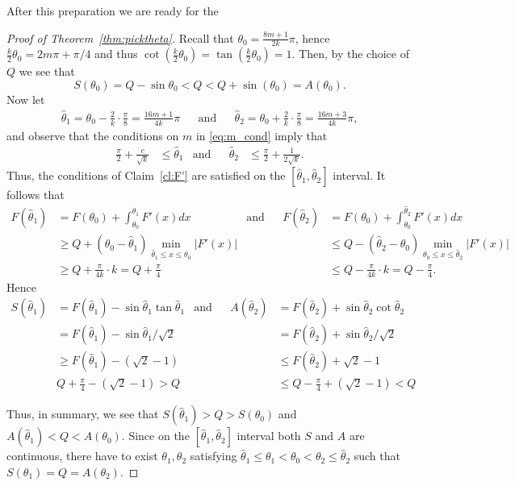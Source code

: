\documentclass{article}
\theoremstyle{definition}
\numberwithin{equation}{section}
\numberwithin{theorem}{section}
\newcommand{\htheta}{\hat{\theta}}
\begin{document}
After this preparation we are ready for the 
\begin{proof}[Proof of Theorem~\ref{thm:picktheta}]
Recall that $\theta_0 = \tfrac{8m+1}{2k}\pi$, hence \(\tfrac{k}{2}\theta_0 = 2m\pi + \pi/4\) and thus $\cot(\tfrac{k}{2}\theta_0) = \tan(\tfrac{k}{2}\theta_0)=1$. Then, by the choice of $Q$ we see that 
\[ S(\theta_0 ) = Q -  \sin \theta_0  < Q < Q + \sin(\theta_0) = A(\theta_0).\]
Now let  
\begin{align*} \htheta_1 = \theta_0 - \frac{2}{k}\cdot \frac{\pi}{8} = \frac{16m+1}{4k}\pi && \mbox{and} && \htheta_2 = \theta_0 + \frac{2}{k}\cdot \frac{\pi}{8} = \frac{16m+3}{4k}\pi,\end{align*} and observe that the conditions on $m$ in \eqref{eq:m_cond} imply that 
\begin{align*}\frac{\pi}{2} + \frac{c}{\sqrt{k}} &\leq \htheta_1 & \mbox{and}&& \htheta_2 &\leq \frac{\pi}{2} + \frac{1}{2\sqrt{k}}.
\end{align*} Thus, the conditions of Claim~\ref{cl:F'} are satisfied on the $[\htheta_1,\htheta_2]$ interval. It follows that
\begin{align*}
    F(\htheta_1) &= F(\theta_0)+\int_{\theta_0}^{\htheta_1} F'(x)dx & \mbox{and}& & F(\htheta_2) &= F(\theta_0) + \int_{\theta_0}^{\htheta_2} F'(x)dx \\
    &\geq Q + (\theta_0-\htheta_1)\min_{\htheta_1 \leq x \leq \theta_0} |F'(x)| &&& &\leq Q - (\htheta_2-\theta_0)\min_{\theta_0 \leq x \leq \htheta_2} |F'(x)|\\
    &\geq Q + \frac{\pi}{4k} \cdot k = Q+ \frac{\pi}{4} &&& &\leq Q - \frac{\pi}{4k}\cdot k = Q - \frac{\pi}{4}. \end{align*}
Hence 
\begin{align*}
    S(\htheta_1) &= F(\htheta_1) - \sin \htheta_1 \tan \htheta_1 & \mbox{and}& & A(\htheta_2)&= F(\htheta_2) + \sin \htheta_2 \cot \htheta_2 \\
    &=F(\htheta_1) - \sin \htheta_1 / \sqrt{2}& && &= F(\htheta_2) + \sin \htheta_2/ \sqrt{2} \\
    &\geq F(\htheta_1)-(\sqrt{2}-1) && &&  \leq F(\htheta_2)+\sqrt{2}-1 \\
    &Q + \frac{\pi}{4} - (\sqrt{2}-1) >Q&& && \leq Q - \frac{\pi}{4} + (\sqrt{2}-1) < Q
\end{align*}

Thus, in summary, we see that $S(\htheta_1) > Q > S(\theta_0)$ and $A(\htheta_1) < Q < A(\theta_0)$. Since on the $[\htheta_1, \htheta_2]$ interval both $S$ and $A$ are continuous, there have to exist $\theta_1, \theta_2$ satisfying $\htheta_1 \leq \theta_1 < \theta_0 < \theta_2 \leq \htheta_2$ such that $S(\theta_1) = Q = A(\theta_2)$.


\end{proof}
\end{document}
